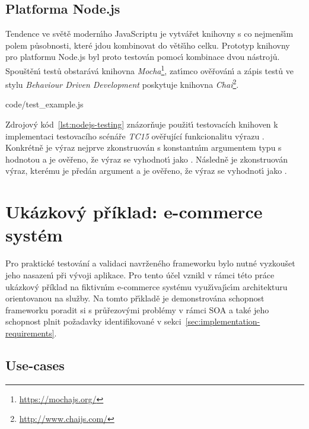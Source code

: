 \subsection{Platforma Node.js}

Tendence ve světě modern\'{\i}ho JavaScriptu je vytvářet knihovny s co nejmenš\'{\i}m polem působnosti,
které jdou kombinovat do větš\'{\i}ho celku. Prototyp knihovny pro platformu Node.js byl proto testován pomoc\'{\i}
kombinace dvou nástrojů. Spouštěn\'{\i} testů obstarává knihovna \textit{Mocha}\footnote{\url{https://mochajs.org/}}, zat\'{\i}mco
ověřován\'{\i} a zápis testů ve stylu \textit{Behaviour Driven Development} poskytuje knihovna \textit{Chai}\footnote{\url{http://www.chaijs.com/}}.


{code/test_example.js}

Zdrojov\'y kód~\ref{lst:nodejs-testing} znázorňuje použit\'{\i} testovacích knihoven k implementaci testovacího
scénáře \textit{TC15} ověřující funkcionalitu výrazu . Konkrétně je výraz nejprve zkonstruován s
konstantn\'{\i}m argumentem typu  s hodnotou  a je ověřeno, že v\'yraz se vyhodnot\'{\i}
jako . Následně je zkonstruován v\'yraz, kterému je předán argument  a je ověřeno,
že v\'yraz se vyhodnot\'{\i} jako .

\section{Ukázkový příklad: e-commerce systém}

Pro praktické testování a validaci navrženého frameworku bylo nutné vyzkoušet
jeho nasazen\'{\i} při v\'yvoji aplikace. Pro tento účel vznikl v
rámci této práce ukázkový příklad na fiktivn\'{\i}m
e-commerce systému využ\'{\i}vaj\'{\i}c\'{\i}m architekturu orientovanou na služby.
Na tomto př\'{\i}kladě je demonstrována schopnost frameworku poradit si s průřezov\'ymi
problémy v rámci \gls{SOA} a také jeho schopnost plnit požadavky identifikované v
sekci~\ref{sec:implementation-requirements}.


\subsection{Use-cases}

